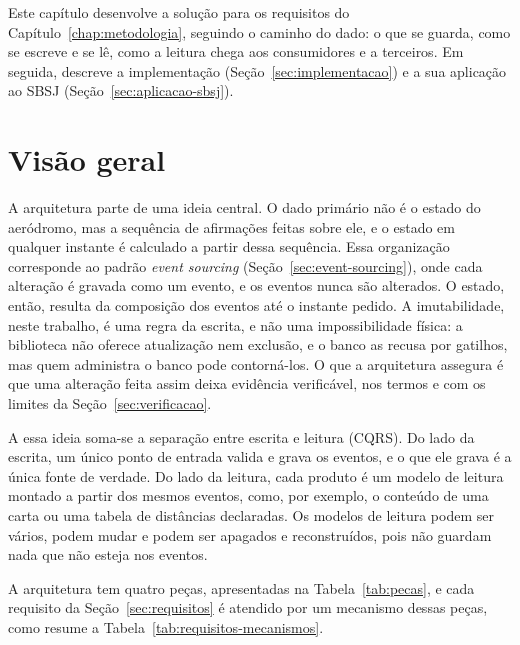 Este capítulo desenvolve a solução para os requisitos do Capítulo~\ref{chap:metodologia}, seguindo o caminho do dado: o que se guarda, como se escreve e se lê, como a leitura chega aos consumidores e a terceiros. Em seguida, descreve a implementação (Seção~\ref{sec:implementacao}) e a sua aplicação ao SBSJ (Seção~\ref{sec:aplicacao-sbsj}).

\section{Visão geral}\label{sec:visao-geral}

A arquitetura parte de uma ideia central. O dado primário não é o estado do aeródromo, mas a sequência de afirmações feitas sobre ele, e o estado em qualquer instante é calculado a partir dessa sequência. Essa organização corresponde ao padrão \textit{event sourcing} (Seção~\ref{sec:event-sourcing}), onde cada alteração é gravada como um evento, e os eventos nunca são alterados. O estado, então, resulta da composição dos eventos até o instante pedido. A imutabilidade, neste trabalho, é uma regra da escrita, e não uma impossibilidade física: a biblioteca não oferece atualização nem exclusão, e o banco as recusa por gatilhos, mas quem administra o banco pode contorná-los. O que a arquitetura assegura é que uma alteração feita assim deixa evidência verificável, nos termos e com os limites da Seção~\ref{sec:verificacao}.

A essa ideia soma-se a separação entre escrita e leitura (CQRS). Do lado da escrita, um único ponto de entrada valida e grava os eventos, e o que ele grava é a única fonte de verdade. Do lado da leitura, cada produto é um modelo de leitura montado a partir dos mesmos eventos, como, por exemplo, o conteúdo de uma carta ou uma tabela de distâncias declaradas. Os modelos de leitura podem ser vários, podem mudar e podem ser apagados e reconstruídos, pois não guardam nada que não esteja nos eventos.

A arquitetura tem quatro peças, apresentadas na Tabela~\ref{tab:pecas}, e cada requisito da Seção~\ref{sec:requisitos} é atendido por um mecanismo dessas peças, como resume a Tabela~\ref{tab:requisitos-mecanismos}.

